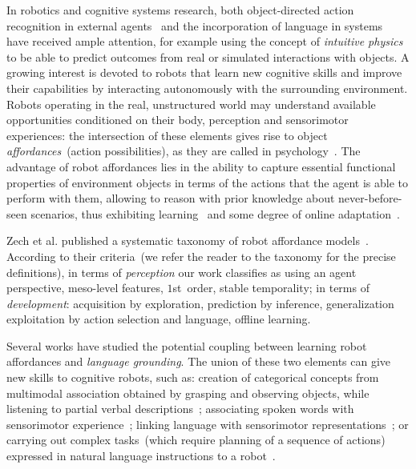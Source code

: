 In robotics and cognitive systems research, both object-directed action recognition in external agents~\cite{koppula:2013:ijrr} and the incorporation of language in \hr{} systems~\cite{harnad:1990,matuszek:2014:aaai} have received ample attention, for example using the concept of \emph{intuitive physics}~\cite{lake:2017:bbs,gao:2018:acl} to be able to predict outcomes from real or simulated interactions with objects.
A growing interest is devoted to robots that learn new cognitive skills and improve their capabilities by interacting autonomously with the surrounding environment.
Robots operating in the real, unstructured world may understand available opportunities conditioned on their body, perception and sensorimotor experiences: the intersection of these elements gives rise to object \emph{affordances}~(action possibilities), as they are called in psychology~\cite{gibson:2014}.
The advantage of robot affordances lies in the ability to capture essential functional properties of environment objects in terms of the actions that the agent is able to perform with them, allowing to reason with prior knowledge about never-before-seen scenarios, thus exhibiting learning~\cite{montesano:2008,jamone:2016:tcds} and some degree of online adaptation~\cite{maestre:2017:icdl}.

Zech et al. published a systematic taxonomy of robot affordance models~\cite{zech:2017:ab}.
According to their criteria~(we refer the reader to the taxonomy for the precise definitions), in terms of \emph{perception} our work classifies as using
an agent perspective, meso-level features, $1$st~order, stable temporality;
in terms of \emph{development}: acquisition by exploration, prediction by inference, generalization
exploitation by action selection and language, offline learning.

Several works have studied the potential coupling between learning robot affordances and \emph{language grounding}.
The union of these two elements can give new skills to cognitive robots, such as:
creation of categorical concepts from multimodal association obtained by grasping and observing objects, while listening to partial verbal descriptions~\cite{nakamura:2009:iros,araki:2012:iros};
associating spoken words with sensorimotor experience~\cite{salvi:2012:smcb,morse:2016:cogsci};
linking language with sensorimotor representations~\cite{stramandinoli:2016:icdl}; or
carrying out complex tasks~(which require planning of a sequence of actions) expressed in natural language instructions to a robot~\cite{antunes:2016:icra}.

